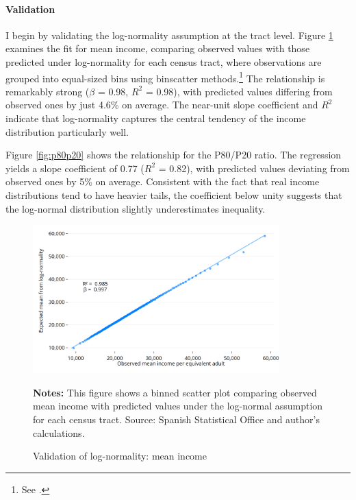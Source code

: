 
\paragraph{Validation} I begin by validating the log-normality assumption at the tract level. Figure \ref{fig:median} examines the fit for mean income, comparing observed values with those predicted under log-normality for each census tract, where observations are grouped into equal-sized bins using binscatter methods.\footnote{See \cite{cattaneo}.} The relationship is remarkably strong ($\beta$ = 0.98, $R^2$ = 0.98), with predicted values differing from observed ones by just 4.6\% on average. The near-unit slope coefficient and $R^2$ indicate that log-normality captures the central tendency of the income distribution particularly well.

Figure \ref{fig:p80p20} shows the relationship for the P80/P20 ratio. The regression yields a slope coefficient of 0.77 ($R^2$ = 0.82), with predicted values deviating from observed ones by 5\% on average. Consistent with the fact that real income distributions tend to have heavier tails, the coefficient below unity suggests that the log-normal distribution slightly underestimates inequality.

\begin{figure}[H]
\begin{center}
\captionsetup{justification=centering}
\caption{Validation of log-normality: mean income}
\label{fig:median}
\includegraphics[width=0.85\textwidth]{output/binned_scatter_mean_2023.png}
\end{center}
\begin{fignotes2}
\textbf{Notes:} This figure shows a binned scatter plot comparing observed mean income with predicted values under the log-normal assumption for each census tract. Source: Spanish Statistical Office and author's calculations.
\end{fignotes2}
\end{figure}

